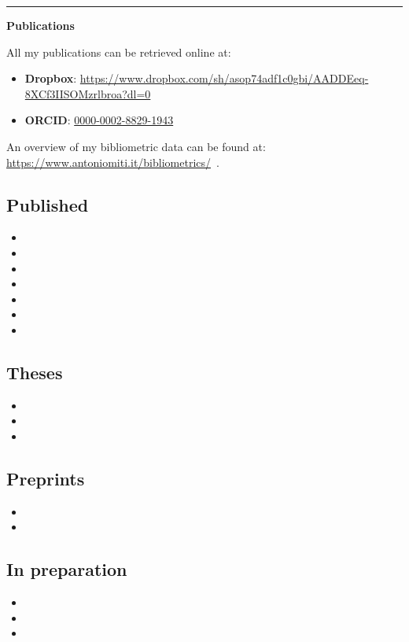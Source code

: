 \documentclass[a4paper]{article}
\newcommand{\block}[1]{\hrule \vspace{0.2cm} \textbf{\Large #1} \vspace{0.2cm}}
\begin{document}
	{\block{Publications}

	All my publications can be retrieved online at:
	\begin{itemize}[leftmargin=*, itemsep=0pt, parsep=0pt, topsep=0pt, partopsep=0pt]
		\item[$\cdot$] \textbf{Dropbox}: \url{https://www.dropbox.com/sh/asop74adf1c0gbi/AADDEeq-8XCf3IISOMzrlbroa?dl=0}
		\item[$\cdot$] \textbf{ORCID}: \href{https://orcid.org/0000-0002-8829-1943}{0000-0002-8829-1943}
	\end{itemize}

	An overview of my bibliometric data can be found at: \url{https://www.antoniomiti.it/bibliometrics/}~.

	
	\subsection*{Published}
\begin{itemize}
\item {}
\item {}
\item {}
\item {}
\item {}
\item {}
\item {}
\end{itemize}
\subsection*{Theses}
\begin{itemize}
\item {}
\item {}
\item {}
\end{itemize}
\subsection*{Preprints}
\begin{itemize}
\item {}
\item {}
\end{itemize}
\subsection*{In preparation}
\begin{itemize}
\item {}
\item {}
\item {}
\end{itemize}	}
\end{document}
